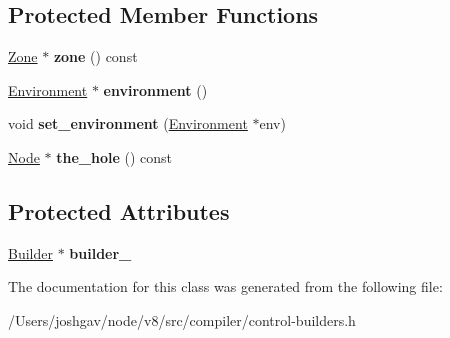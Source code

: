 \subsection*{Protected Member Functions}
\begin{DoxyCompactItemize}
\item 
\hyperlink{classv8_1_1internal_1_1_zone}{Zone} $\ast$ {\bfseries zone} () const \hypertarget{classv8_1_1internal_1_1compiler_1_1_control_builder_a1a306e165bca1a2bfd952033aac2fad9}{}\label{classv8_1_1internal_1_1compiler_1_1_control_builder_a1a306e165bca1a2bfd952033aac2fad9}

\item 
\hyperlink{classv8_1_1internal_1_1compiler_1_1_ast_graph_builder_1_1_environment}{Environment} $\ast$ {\bfseries environment} ()\hypertarget{classv8_1_1internal_1_1compiler_1_1_control_builder_a6827bdf3a172d73c522f9347e206e481}{}\label{classv8_1_1internal_1_1compiler_1_1_control_builder_a6827bdf3a172d73c522f9347e206e481}

\item 
void {\bfseries set\+\_\+environment} (\hyperlink{classv8_1_1internal_1_1compiler_1_1_ast_graph_builder_1_1_environment}{Environment} $\ast$env)\hypertarget{classv8_1_1internal_1_1compiler_1_1_control_builder_a004c33b068cc4f4fce8eea72a81c64a6}{}\label{classv8_1_1internal_1_1compiler_1_1_control_builder_a004c33b068cc4f4fce8eea72a81c64a6}

\item 
\hyperlink{classv8_1_1internal_1_1compiler_1_1_node}{Node} $\ast$ {\bfseries the\+\_\+hole} () const \hypertarget{classv8_1_1internal_1_1compiler_1_1_control_builder_a5fdd00971c1a59ef63731d72ab5f5540}{}\label{classv8_1_1internal_1_1compiler_1_1_control_builder_a5fdd00971c1a59ef63731d72ab5f5540}

\end{DoxyCompactItemize}
\subsection*{Protected Attributes}
\begin{DoxyCompactItemize}
\item 
\hyperlink{classv8_1_1internal_1_1compiler_1_1_ast_graph_builder}{Builder} $\ast$ {\bfseries builder\+\_\+}\hypertarget{classv8_1_1internal_1_1compiler_1_1_control_builder_a21056a7cf7b3e1204fccd86408d7e438}{}\label{classv8_1_1internal_1_1compiler_1_1_control_builder_a21056a7cf7b3e1204fccd86408d7e438}

\end{DoxyCompactItemize}


The documentation for this class was generated from the following file\+:\begin{DoxyCompactItemize}
\item 
/\+Users/joshgav/node/v8/src/compiler/control-\/builders.\+h\end{DoxyCompactItemize}
